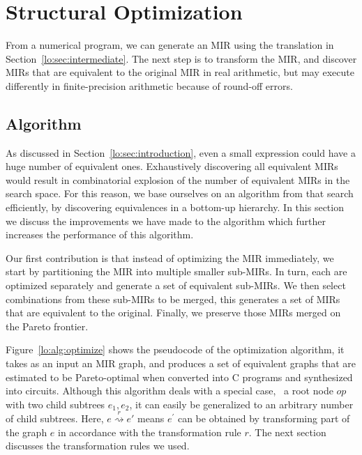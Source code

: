 \section{Structural Optimization}
\label{lo:sec:structural_optimization}

From a numerical program, we can generate an MIR using the translation in
Section~\ref{lo:sec:intermediate}.  The next step is to transform the MIR, and
discover MIRs that are equivalent to the original MIR in real arithmetic, but
may execute differently in finite-precision arithmetic because of round-off
errors.

\subsection{Algorithm}
\label{lo:sub:algorithm}


As discussed in Section~\ref{lo:sec:introduction}, even a small expression
could have a huge number of equivalent ones.  Exhaustively discovering all
equivalent MIRs would result in combinatorial explosion of the number of
equivalent MIRs in the search space.  For this reason, we base ourselves on an
algorithm from \SOAP{} that search efficiently, by discovering equivalences
in a bottom-up hierarchy.  In this section we discuss the improvements we
have made to the algorithm which further increases the performance of this
algorithm.

Our first contribution is that instead of optimizing the MIR immediately, we
start by partitioning the MIR into multiple smaller sub-MIRs.  In turn, each
are optimized separately and generate a set of equivalent sub-MIRs.  We then
select combinations from these sub-MIRs to be merged, this generates a set of
MIRs that are equivalent to the original.  Finally, we preserve those MIRs
merged on the Pareto frontier.

Figure~\ref{lo:alg:optimize} shows the pseudocode of the optimization
algorithm, it takes as an input an MIR graph, and produces a set of equivalent
graphs that are estimated to be Pareto-optimal when converted into C programs
and synthesized into circuits.  Although this algorithm deals with a special
case, \ie~a root node $op$ with two child subtrees $e_1, e_2$, it can
easily be generalized to an arbitrary number of child subtrees.  Here, $e
\stackrel{r}{\rightsquigarrow} e'$ means $e^\prime$ can be obtained by
transforming part of the graph $e$ in accordance with the transformation rule
$r$.  The next section discusses the transformation rules we used.

